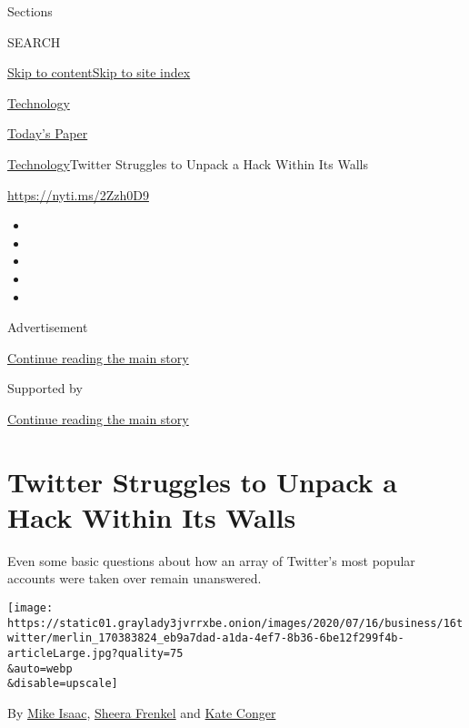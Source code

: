 Sections

SEARCH

\protect\hyperlink{site-content}{Skip to
content}\protect\hyperlink{site-index}{Skip to site index}

\href{https://www.nytimes3xbfgragh.onion/section/technology}{Technology}

\href{https://myaccount.nytimes3xbfgragh.onion/auth/login?response_type=cookie\&client_id=vi}{}

\href{https://www.nytimes3xbfgragh.onion/section/todayspaper}{Today's
Paper}

\href{/section/technology}{Technology}\textbar{}Twitter Struggles to
Unpack a Hack Within Its Walls

\href{https://nyti.ms/2Zzh0D9}{https://nyti.ms/2Zzh0D9}

\begin{itemize}
\item
\item
\item
\item
\item
\end{itemize}

Advertisement

\protect\hyperlink{after-top}{Continue reading the main story}

Supported by

\protect\hyperlink{after-sponsor}{Continue reading the main story}

\hypertarget{twitter-struggles-to-unpack-a-hack-within-its-walls}{%
\section{Twitter Struggles to Unpack a Hack Within Its
Walls}\label{twitter-struggles-to-unpack-a-hack-within-its-walls}}

Even some basic questions about how an array of Twitter's most popular
accounts were taken over remain unanswered.

\texttt{[image: https://static01.graylady3jvrrxbe.onion/images/2020/07/16/business/16twitter/merlin\_170383824\_eb9a7dad-a1da-4ef7-8b36-6be12f299f4b-articleLarge.jpg?quality=75\\\&auto=webp\\\&disable=upscale]}

By \href{https://www.nytimes3xbfgragh.onion/by/mike-isaac}{Mike Isaac},
\href{https://www.nytimes3xbfgragh.onion/by/sheera-frenkel}{Sheera
Frenkel} and
\href{https://www.nytimes3xbfgragh.onion/by/kate-conger}{Kate Conger}


